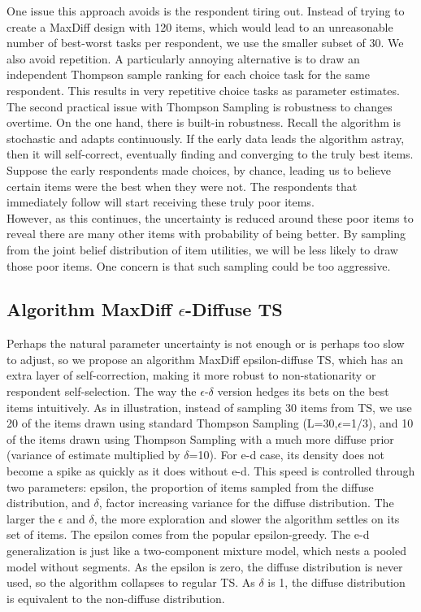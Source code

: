 \documentclass[nonblindrev]{informs3}
\begin{document}
One issue this approach avoids is the respondent tiring out. Instead of trying to create a MaxDiff design with 120 items, which would lead to an unreasonable number of best-worst tasks per respondent, we use the smaller subset of 30.  We also avoid repetition. A particularly annoying alternative is to draw an independent Thompson sample ranking for each choice task for the same respondent. This results in very repetitive choice tasks as parameter estimates. \\
The second practical issue with Thompson Sampling is robustness to changes overtime. On the one hand, there is built-in robustness. Recall the algorithm is stochastic and adapts continuously. If the early data leads the algorithm astray, then it will self-correct, eventually finding and converging to the truly best items. Suppose the early respondents made choices, by chance, leading us to believe certain items were the best when they were not. The respondents that immediately follow will start receiving these truly poor items. \\
However, as this continues, the uncertainty is reduced around these poor items to reveal there are many other items with probability of being better. By sampling from the joint belief distribution of item utilities, we will be less likely to draw those poor items. One concern is that such sampling could be too aggressive.\\
\subsection{Algorithm MaxDiff $\epsilon$-Diffuse TS}
Perhaps the natural parameter uncertainty is not enough or is perhaps too slow to adjust, so we propose an algorithm MaxDiff epsilon-diffuse TS, which has an extra layer of self-correction, making it more robust to non-stationarity or respondent self-selection. 
The way the $\epsilon$-$\delta$ version hedges its bets on the best items intuitively. As in illustration, instead of sampling 30 items from TS, we use 20 of the items drawn using standard Thompson Sampling (L=30,$\epsilon$=1/3), and 10 of the items drawn using Thompson Sampling with a much more diffuse prior (variance of estimate multiplied by $\delta$=10).
For e-d case, its density does not become a spike as quickly as it does without e-d. This speed is controlled through two parameters: epsilon, the proportion of items sampled from the diffuse distribution, and $\delta$, factor increasing variance for the diffuse distribution.  The larger the $\epsilon$ and $\delta$, the more exploration and slower the algorithm settles on its set of items. The epsilon comes from the popular epsilon-greedy.
The e-d generalization is just like a two-component mixture model, which nests a pooled model without segments. As the epsilon is zero, the diffuse distribution is never used, so the algorithm collapses to regular TS. As $\delta$ is 1, the diffuse distribution is equivalent to the non-diffuse distribution. 
\end{document}

